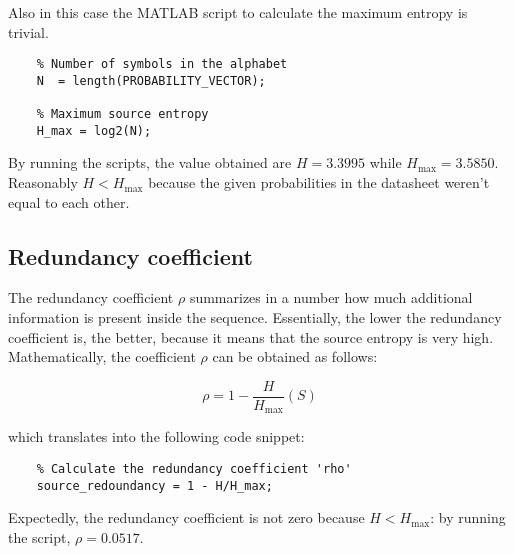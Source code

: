 \noindent Also in this case the MATLAB script to calculate the maximum entropy is trivial.

\begin{lstlisting}
    % Number of symbols in the alphabet
    N  = length(PROBABILITY_VECTOR);

    % Maximum source entropy
    H_max = log2(N);
\end{lstlisting}

\noindent By running the scripts, the value obtained are $H = 3.3995$ while $H_{\max} = 3.5850$. Reasonably $H < H_{\max}$ because the given probabilities in the datasheet weren't equal to each other.

% 
\subsection{Redundancy coefficient}

The redundancy coefficient $\rho$ summarizes in a number how much additional information is present inside the sequence. Essentially, the lower the redundancy coefficient is, the better, because it means that the source entropy is very high. Mathematically, the coefficient $\rho$ can be obtained as follows:

\begin{equation*}
    \rho = 1 - \frac{H}{H_{\max}}(S)    
\end{equation*}

\noindent which translates into the following code snippet:

\begin{lstlisting}
    % Calculate the redundancy coefficient 'rho'
    source_redoundancy = 1 - H/H_max;
\end{lstlisting}

\noindent Expectedly, the redundancy coefficient is not zero because $H<H_{\max}$: by running the script, $\rho = 0.0517$.



